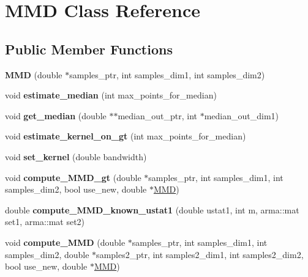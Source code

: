 \hypertarget{classMMD}{}\section{M\+MD Class Reference}
\label{classMMD}
\subsection*{Public Member Functions}
\begin{DoxyCompactItemize}
\item 
{\bfseries M\+MD} (double $\ast$samples\+\_\+ptr, int samples\+\_\+dim1, int samples\+\_\+dim2)\hypertarget{classMMD_a9fa2c3a131f1028c8d8482cd3f481188}{}\label{classMMD_a9fa2c3a131f1028c8d8482cd3f481188}

\item 
void {\bfseries estimate\+\_\+median} (int max\+\_\+points\+\_\+for\+\_\+median)\hypertarget{classMMD_a3fccd3ddfd019c5dd835b09157734f7d}{}\label{classMMD_a3fccd3ddfd019c5dd835b09157734f7d}

\item 
void {\bfseries get\+\_\+median} (double $\ast$$\ast$median\+\_\+out\+\_\+ptr, int $\ast$median\+\_\+out\+\_\+dim1)\hypertarget{classMMD_aa695bfbce199b8af0720d185756b952e}{}\label{classMMD_aa695bfbce199b8af0720d185756b952e}

\item 
void {\bfseries estimate\+\_\+kernel\+\_\+on\+\_\+gt} (int max\+\_\+points\+\_\+for\+\_\+median)\hypertarget{classMMD_aefe8bf6b7a93c6c801362f245e08aae6}{}\label{classMMD_aefe8bf6b7a93c6c801362f245e08aae6}

\item 
void {\bfseries set\+\_\+kernel} (double bandwidth)\hypertarget{classMMD_a69009ba2236bcab4beef117a37c6ccdb}{}\label{classMMD_a69009ba2236bcab4beef117a37c6ccdb}

\item 
void {\bfseries compute\+\_\+\+M\+M\+D\+\_\+gt} (double $\ast$samples\+\_\+ptr, int samples\+\_\+dim1, int samples\+\_\+dim2, bool use\+\_\+new, double $\ast$\hyperlink{classMMD}{M\+MD})\hypertarget{classMMD_abcf8787a6ec23db6b56fb2cc72433c1b}{}\label{classMMD_abcf8787a6ec23db6b56fb2cc72433c1b}

\item 
double {\bfseries compute\+\_\+\+M\+M\+D\+\_\+known\+\_\+ustat1} (double ustat1, int m, arma\+::mat set1, arma\+::mat set2)\hypertarget{classMMD_aadb3999575706fad2d4dd406c6da2859}{}\label{classMMD_aadb3999575706fad2d4dd406c6da2859}

\item 
void {\bfseries compute\+\_\+\+M\+MD} (double $\ast$samples\+\_\+ptr, int samples\+\_\+dim1, int samples\+\_\+dim2, double $\ast$samples2\+\_\+ptr, int samples2\+\_\+dim1, int samples2\+\_\+dim2, bool use\+\_\+new, double $\ast$\hyperlink{classMMD}{M\+MD})\hypertarget{classMMD_a44633faa6e8c3f8428b760333c9ee5e4}{}\label{classMMD_a44633faa6e8c3f8428b760333c9ee5e4}

\end{DoxyCompactItemize}
